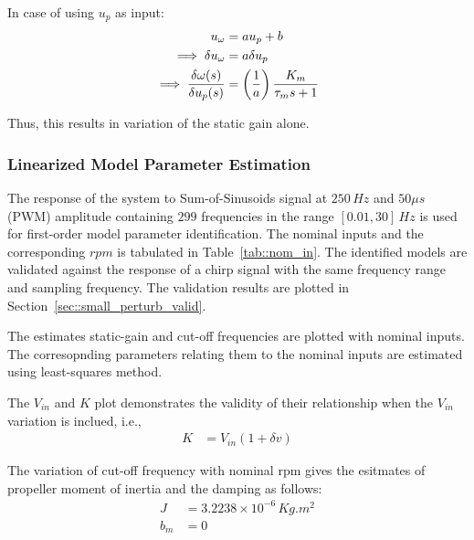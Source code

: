 In case of using $u_p$ as input:
\begin{align*}
    u_\omega &= a u_p + b\\
    \implies \delta u_\omega &= a \delta u_p\\
    \implies \frac{\delta \omega(s)}{\delta u_p(s)} &= \left( \frac{1}{a} \right)\frac{K_m}{\tau_m s + 1}
\end{align*}

Thus, this results in variation of the static gain alone.


\subsubsection{Linearized Model Parameter Estimation}
The response of the system to Sum-of-Sinusoids signal at $250 \, Hz$ and $50 \mu s$ (PWM) amplitude containing $299$ frequencies in the range $[0.01, 30]\,Hz$ is used for first-order model parameter identification. The nominal inputs and the corresponding $rpm$ is tabulated in Table~\ref{tab::nom_in}. The identified models are validated against the response of a chirp signal with the same frequency range and sampling frequency. The validation results are plotted in Section~\ref{sec::small_perturb_valid}.

The estimates static-gain and cut-off frequencies are plotted with nominal inputs. The corresopnding parameters relating them to the nominal inputs are estimated using least-squares method.

The $V_{in}$ and $K$ plot demonstrates the validity of their relationship when the $V_{in}$ variation is inclued, i.e.,
\begin{align*}
    K &= V_{in} (1 + \delta v)
\end{align*}

The variation of cut-off frequency with nominal rpm gives the esitmates of propeller moment of inertia and the damping as follows:
\begin{align*}
    J &= 3.2238 \times 10^{-6} \, Kg .m^2\\
    b_m &= 0
\end{align*}

